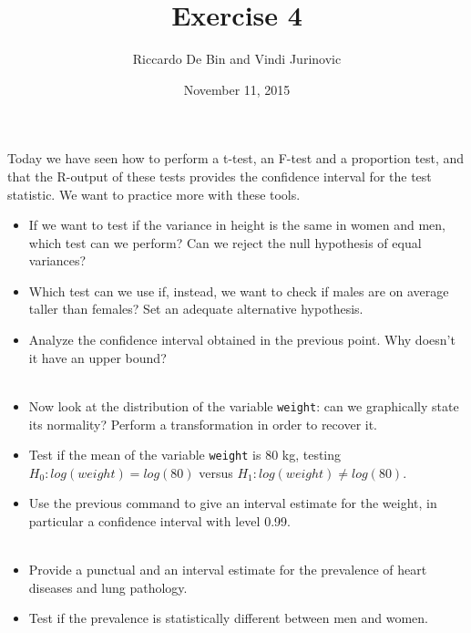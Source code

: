\documentclass[]{article}
\title{Exercise 4}
\author{Riccardo De Bin and Vindi Jurinovic}
\date{November 11, 2015}
\begin{document}
\maketitle


Today we have seen how to perform a t-test, an F-test and a proportion
test, and that the R-output of these tests provides the confidence
interval for the test statistic. We want to practice more with these
tools.

\begin{itemize}
\itemsep1pt\parskip0pt
\item
  If we want to test if the variance in height is the same in women and
  men, which test can we perform? Can we reject the null hypothesis of
  equal variances?\\
\item
  Which test can we use if, instead, we want to check if males are on
  average taller than females? Set an adequate alternative hypothesis.\\
\item
  Analyze the confidence interval obtained in the previous point. Why
  doesn't it have an upper bound?\\\\
\item
  Now look at the distribution of the variable \texttt{weight}: can we
  graphically state its normality? Perform a transformation in order to
  recover it.\\
\item
  Test if the mean of the variable \texttt{weight} is 80 kg, testing
  $H_0 : log(weight) = log(80)$ versus
  $H_1 : log(weight) \neq log(80)$.\\
\item
  Use the previous command to give an interval estimate for the weight,
  in particular a confidence interval with level 0.99.\\\\
\item
  Provide a punctual and an interval estimate for the prevalence of
  heart diseases and lung pathology.\\
\item
  Test if the prevalence is statistically different between men and
  women.
\end{itemize}
\end{document}
